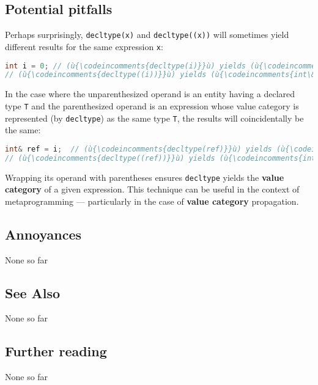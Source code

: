 \subsection[Potential pitfalls]{Potential pitfalls}\label{potential-pitfalls}

Perhaps surprisingly, \texttt{decltype(x)} and \texttt{decltype((x))}
will sometimes yield different results for the same expression
\texttt{x}:

\begin{lstlisting}[language=C++]
int i = 0; // (ù{\codeincomments{decltype(i)}}ù) yields (ù{\codeincomments{int}}ù).
// (ù{\codeincomments{decltype((i))}}ù) yields (ù{\codeincomments{int\&}}ù).
\end{lstlisting}

\noindent In the case where the unparenthesized operand is an entity having a
declared type \texttt{T} and the parenthesized operand is an expression
whose value category is represented (by \texttt{decltype}) as the same
type \texttt{T}, the results will coincidentally be the same:

\begin{lstlisting}[language=C++]
int& ref = i;  // (ù{\codeincomments{decltype(ref)}}ù) yields (ù{\codeincomments{int\&}}ù).
// (ù{\codeincomments{decltype((ref))}}ù) yields (ù{\codeincomments{int\&}}ù).
\end{lstlisting}

\noindent Wrapping its operand with parentheses ensures \texttt{decltype} yields
the \textbf{value category} of a given expression. This technique can be
useful in the context of metaprogramming --- particularly in the case of
\textbf{value category} propagation.

\subsection[Annoyances]{Annoyances}\label{annoyances}

None so far

\subsection[See Also]{See Also}\label{see-also}

None so far

\subsection[Further reading]{Further reading}\label{further-reading}

None so far


